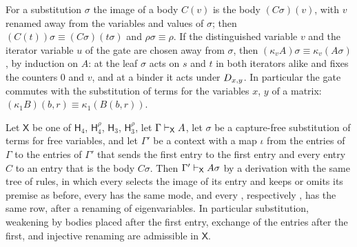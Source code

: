 For a substitution $\sigma$ the image of a body $C(v)$ is the body
$(C\sigma)(v)$, with $v$ renamed away from the variables and values of
$\sigma$; then $(C(t))\sigma\equiv(C\sigma)(t\sigma)$ and
$\rho\sigma\equiv\rho$. If the distinguished variable $v$ and the iterator
variable $u$ of the gate are chosen away from $\sigma$, then
$(\kappa_vA)\sigma\equiv\kappa_v(A\sigma)$, by induction on $A$: at the leaf
$\sigma$ acts on $s$ and $t$ in both iterators alike and fixes the counters
$0$ and $v$, and at a binder it acts under $D_{x,y}$. In particular the
gate commutes with the substitution of terms for the variables $x$, $y$ of
a matrix: $(\kappa_1B)(b,r)\equiv\kappa_1(B(b,r))$.

\begin{theorem}
\label{claus:thm:hsubst}
Let $\mathsf{X}$ be one of $\mathsf{H}_4$, $\mathsf{H}_4^{\rho}$,
$\mathsf{H}_3$, $\mathsf{H}_3^{\rho}$, let
$\Gamma\vdash_{\mathsf{X}}A$, let $\sigma$ be a capture-free substitution
of terms for free variables, and let $\Gamma'$ be a context with a map
$\iota$ from the entries of $\Gamma$ to the entries of $\Gamma'$ that sends
the first entry to the first entry and every entry $C$ to an entry that is
the body $C\sigma$. Then $\Gamma'\vdash_{\mathsf{X}}A\sigma$ by a
derivation with the same tree of rules, in which every 
selects the image of its entry and keeps or omits its premise as before,
every  has the same mode, and every ,
respectively , has the same row, after a renaming of
eigenvariables. In particular substitution, weakening by bodies placed
after the first entry, exchange of the entries after the first, and
injective renaming are admissible in $\mathsf{X}$.
\end{theorem}
